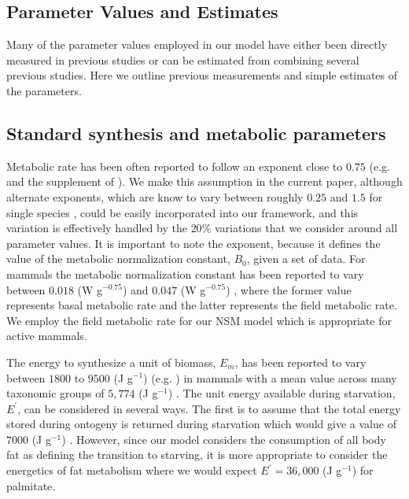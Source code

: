 \documentclass{pnastwo}
\begin{document}
\begin{article}

\section*{Parameter Values and Estimates}

Many of the parameter values employed in our model have either been directly measured in previous studies or can be estimated from combining several previous studies. Here we outline previous measurements and simple estimates of the parameters. 

\subsection*{Standard synthesis and metabolic parameters}

Metabolic rate has been often reported to follow an exponent close to $0.75$ (e.g. \cite{West:2001bv,moses2008rmo} and the supplement of \cite{hou}). We make this assumption in the current paper, although alternate exponents, which are know to vary between roughly $0.25$ and $1.5$ for single species \cite{moses2008rmo}, could be easily incorporated into our framework, and this variation is effectively handled by the $20\%$ variations that we consider around all parameter values. It is important to note the exponent, because it defines the value of the metabolic normalization constant, $B_{0}$, given a set of data.  For mammals the metabolic normalization constant has been reported to vary between $0.018$ (W g$^{-0.75}$) and $0.047$ (W g$^{-0.75}$) \cite{hou,West:2001bv}, where the former value represents basal metabolic rate and the latter represents the field metabolic rate. We employ the field metabolic rate for our NSM model which is appropriate for active mammals.

The energy to synthesize a unit of biomass, $E_{m}$, has been reported to vary between $1800$ to $9500$ (J g$^{-1}$) (e.g. \cite{West:2001bv,moses2008rmo,hou}) in mammals with a mean value across many taxonomic groups of $5,774$ (J g$^{-1}$) \cite{moses2008rmo}. The unit energy available during starvation, $E^{\prime}$, can be considered in several ways. The first is to assume that the total energy stored during ontogeny is returned during starvation which would give a value of $7000$ (J g$^{-1}$) \cite{hou}. However, since our model considers the consumption of all body fat as defining the transition to starving, it is more appropriate to consider the energetics of fat metabolism where we would expect $E^{\prime}=36,000$ (J g$^{-1}$) for palmitate\cite{stryer,hou}.


\end{article}
\end{document}
